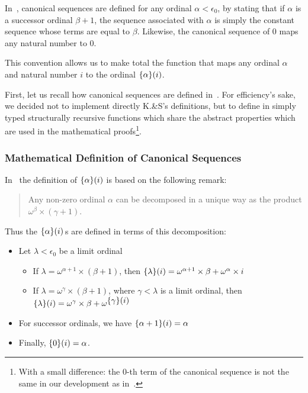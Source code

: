 \begin{remark}
  In~\cite{KS81}, canonical sequences are defined for any ordinal $\alpha <\epsilon_0$,
by stating that if $\alpha$ is a successor ordinal $\beta+1$,  the sequence associated with 
$\alpha$ is simply the constant sequence whose terms are equal to $\beta$.
Likewise, the canonical sequence of $0$ maps any natural number to $0$.

This convention allows us to make total the function that maps any ordinal $\alpha$ and natural number $i$ to the ordinal $\mbox{$\{\alpha\}(i)$}$.

\end{remark}


First, let us recall how canonical sequences are defined in~\cite{KS81}. For efficiency's sake, we decided not to implement directly K.\&S's definitions, but to define in \gallina{} simply typed structurally recursive functions which share the abstract properties which are used in the mathematical proofs\footnote{With a small difference: the $0$-th term of the canonical sequence is not the same in our development as in~\cite{KS81}.}.





\subsubsection{Mathematical Definition of Canonical Sequences} 

In~\cite{KS81} the definition of $\mbox{$\{\alpha\}(i)$}$ is based on the following remark:
\begin{quote}
Any non-zero ordinal $\alpha$ can be decomposed in a unique way as the product
$\omega^\beta\times (\gamma+1)$.
\end{quote}

Thus the $\mbox{$\{\alpha\}(i)$}$\,s are defined in terms of this decomposition:
\begin{definition}
\label{def:canonseq-math}
  
\end{definition}
\begin{mathframe}
  \begin{itemize}
\item Let $\lambda<\epsilon_0$ be a limit ordinal 

\begin{itemize}
\item If $\lambda=\omega^{\alpha+1}\times (\beta+1)$, then 
$\mbox{$\{\lambda\}(i)$}= \omega^{\alpha+1}\times\beta +  \omega^\alpha \times i$
\item If $\lambda=\omega^{\gamma}\times (\beta+1)$, where $\gamma<\lambda$ is a limit ordinal, then 
$\mbox{$\{\lambda\}(i)$}=\omega^{\gamma}\times \beta + \omega^{\mbox{$\{\gamma\}(i)$}}$
\end{itemize}

\item For successor ordinals, we have $\mbox{$\{\alpha+1\}(i)$}= \alpha$ 

\item Finally, $\mbox{$\{0\}(i)$}= \alpha$.
\end{itemize}
\end{mathframe}

